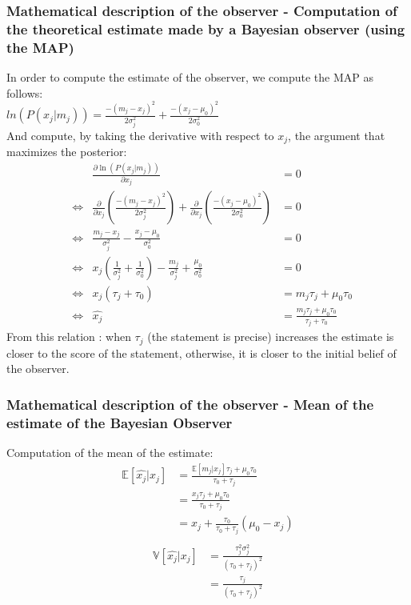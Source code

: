 \documentclass{article}
\begin{document}
\subsubsection{Mathematical description of the observer - Computation of the theoretical estimate made by a Bayesian observer (using the MAP)}
In order to compute the estimate of the observer, we compute the MAP as follows:\\
$ln(P(x_j | m_j)) = \frac{-(m_j-x_j)^2}{2 \sigma^2_j} + \frac{-(x_j-\mu_0)^2}{2 \sigma_0^2}$\\
And compute, by taking the derivative with respect to $x_j$, the argument that maximizes the posterior:\\
\begin{align*}
    &&\frac{\partial \ln(P(x_j | m_j))}{\partial x_j} &= 0 \\
    &\iff &\frac{\partial}{\partial x_j} \left( \frac{-(m_j-x_j)^2}{2 \sigma^2_j} \right) + \frac{\partial}{\partial x_j} \left( \frac{-(x_j-\mu_0)^2}{2 \sigma_0^2} \right) &= 0 \\
    &\iff &\frac{m_j - x_j}{\sigma^2_j} - \frac{x_j - \mu_0}{\sigma_0^2} &= 0 \\
    &\iff &x_j\left(\frac{1}{\sigma^2_j} + \frac{1}{\sigma^2_0}\right) - \frac{m_j}{\sigma^2_j} + \frac{\mu_0}{\sigma^2_0} &= 0\\
    &\iff &x_j(\tau_j+\tau_0)&= m_j\tau_j+\mu_0 \tau_0\\
    &\iff &\hat{x_j} &= \frac{m_j\tau_j+\mu_0\tau_0}{\tau_j+\tau_0}
\end{align*}
From this relation : when $\tau_j$ (the statement is precise) increases the estimate is closer to the score of the statement, otherwise, it is closer to the initial belief of the observer.\\
\subsubsection*{Mathematical description of the observer - Mean of the estimate of the Bayesian Observer}
Computation of the mean of the estimate:\\
\begin{align*}
    \mathbb{E}[\hat{x_j} |x_j] &= \frac{\mathbb{E}[m_j |x_j]\tau_j + \mu_0 \tau_0}{\tau_0 +\tau_j}\\
    &= \frac{x_j \tau_j +\mu_0\tau_0}{\tau_0+\tau_j}\\
    &=x_j+\frac{\tau_0}{\tau_0+\tau_j}(\mu_0-x_j)\\
\end{align*}
\begin{align*}
    \mathbb{V}[\hat{x_j} |x_j] &= \frac{\tau^2_j \sigma^2_j}{(\tau_0+\tau_j)^2}\\
    &= \frac{\tau_j}{(\tau_0 + \tau_j)^2}\\
\end{align*}
\end{document}
